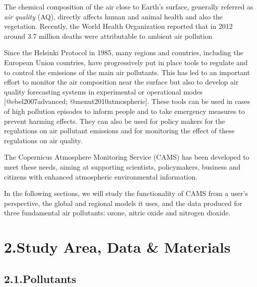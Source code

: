 \documentclass[9pt]{report}
\begin{document}
\noindent{}The chemical composition of the air close to Earth’s surface, generally referred as \emph{air quality} (AQ), directly affects human and animal health and also the vegetation.
Recently, the World Health Organization reported that in 2012 around 3.7 million deaths were attributable to ambient air pollution %

Since the Helsinki Protocol in 1985, many regions and countries, including the European Union countries, have progressively put in place tools to regulate and to control the emissions of the main air pollutants.
This has led to an important effort to monitor the air composition near the surface but also to develop air quality forecasting systems in experimental or operational modes [@ebel2007advanced; @menut2010atmospheric].
These tools can be used in cases of high pollution episodes to inform people and to take emergency measures to prevent harming effects.
They can also be used for policy makers for the regulations on air pollutant emissions and for monitoring the effect of these regulations on air quality.%

The Copernicus Atmosphere Monitoring Service (CAMS)
has been developed to meet these needs, aiming at supporting scientists, policymakers,
business and citizens with enhanced atmospheric environmental information.%

In the following sections, we will study the functionality of CAMS from a user's perspective, the global and regional models it uses, and the data produced for three fundamental air pollutants: ozone, nitric oxide and nitrogen dioxide.%

\section{2.\hspace*{0.5em}Study Area, Data \& Materials}\label{sec-study-area-data-materials}%

\subsection{2.1.\hspace*{0.5em}Pollutants}\label{sec-pollutants}%
\end{document}
